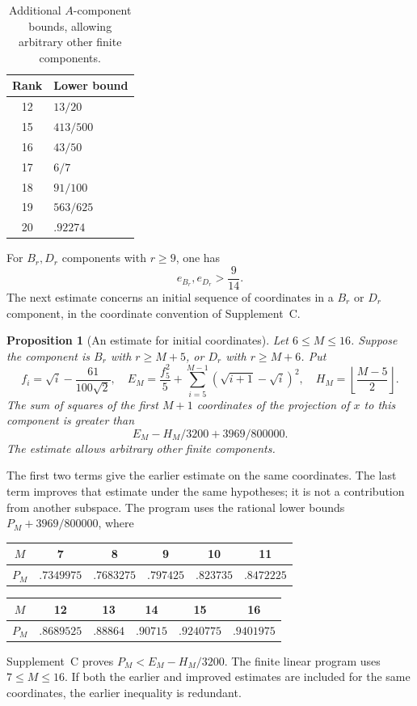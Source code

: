 \documentclass[11pt]{article}
\newtheorem{proposition}[theorem]{Proposition}
\theoremstyle{definition}
\theoremstyle{remark}
\numberwithin{equation}{section}
\begin{document}
\begin{table}[htbp]
\centering
\caption{Additional $A$-component bounds, allowing arbitrary other finite components.}
\label{c:A-table}
\begin{tabular}{cl}
\toprule
Rank&Lower bound\\\midrule
12&$13/20$\\
15&$413/500$\\
16&$43/50$\\
17&$6/7$\\
18&$91/100$\\
19&$563/625$\\
20&$.92274$\\\bottomrule
\end{tabular}
\end{table}

For $B_r,D_r$ components with $r\ge9$, one has
\begin{equation}\label{c:BD-nine}
                         e_{B_r},e_{D_r}>\frac9{14}.
\end{equation}
The next estimate concerns an initial sequence of coordinates in a
$B_r$ or $D_r$ component, in the coordinate convention of Supplement~C.

\begin{proposition}[An estimate for initial coordinates]
\label{c:prefix-input}
Let $6\le M\le16$. Suppose the component is $B_r$ with
$r\ge M+5$, or $D_r$ with $r\ge M+6$. Put
\[
 f_i=\sqrt i-\frac{61}{100\sqrt2},\quad
 E_M=\frac{f_5^2}{5}+
        \sum_{i=5}^{M-1}(\sqrt{i+1}-\sqrt i)^2,
 \quad H_M=\left\lfloor\frac{M-5}{2}\right\rfloor.
\]
The sum of squares of the first $M+1$ coordinates of the projection
of $x$ to this component is greater than
\begin{equation}\label{c:prefix-formula}
                  E_M-H_M/3200+3969/800000.
\end{equation}
The estimate allows arbitrary other finite components.
\end{proposition}

The first two terms give the earlier estimate on the same
coordinates. The last term improves that estimate under the same
hypotheses; it is not a contribution from another subspace.
The program uses the rational lower bounds $P_M+3969/800000$,
where
\begin{center}
\begin{tabular}{c|ccccc}
$M$&7&8&9&10&11\\\hline
$P_M$&$.7349975$&$.7683275$&$.797425$&$.823735$&$.8472225$\\[2pt]
\end{tabular}
\par\smallskip
\begin{tabular}{c|ccccc}
$M$&12&13&14&15&16\\\hline
$P_M$&$.8689525$&$.88864$&$.90715$&$.9240775$&$.9401975$
\end{tabular}
\end{center}
Supplement~C proves $P_M<E_M-H_M/3200$. The finite linear program
uses $7\le M\le16$. If both the earlier and improved estimates are
included for the same coordinates, the earlier inequality is redundant.
\end{document}
